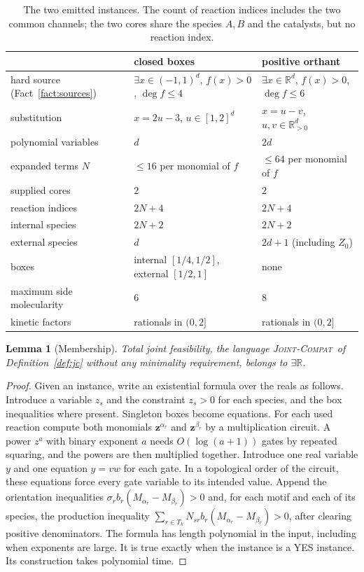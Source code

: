 \documentclass[11pt,a4paper]{article}
\theoremstyle{plain}
\newtheorem{lemma}[theorem]{Lemma}
\theoremstyle{definition}
\theoremstyle{remark}
\newcommand{\ER}{\exists\mathbb{R}}
\newcommand{\R}{\mathbb{R}}
\newcommand{\act}{\boldsymbol z}
\newcommand{\JC}{\textup{\textsc{Joint-Compat}}}
\begin{document}
\begin{table}[t]
\centering\small
\begin{tabular}{@{}lll@{}}\toprule
 & closed boxes & positive orthant\\\midrule
hard source (Fact~\ref{fact:sources}) & $\exists x\in(-1,1)^d$, $f(x)>0$, $\deg f\le4$ & $\exists x\in\R^d$, $f(x)>0$, $\deg f\le6$\\
substitution & $x=2u-3$, $u\in[1,2]^d$ & $x=u-v$, $u,v\in\R^d_{>0}$\\
polynomial variables & $d$ & $2d$\\
expanded terms $N$ & $\le16$ per monomial of $f$ & $\le64$ per monomial of $f$\\
supplied cores & $2$ & $2$\\
reaction indices & $2N+4$ & $2N+4$\\
internal species & $2N+2$ & $2N+2$\\
external species & $d$ & $2d+1$ (including $Z_0$)\\
boxes & internal $[1/4,1/2]$, external $[1/2,1]$ & none\\
maximum side molecularity & $6$ & $8$\\
kinetic factors & rationals in $(0,2]$ & rationals in $(0,2]$\\\bottomrule
\end{tabular}
\caption{The two emitted instances. The count of reaction indices includes the two common channels; the two cores share the species $A,B$ and the catalysts, but no reaction index.}
\label{tab:size}
\end{table}

\begin{lemma}[Membership]\label{lem:membership}
Total joint feasibility, the language \JC\ of Definition~\ref{def:jc} without any minimality requirement, belongs to $\ER$.
\end{lemma}

\begin{proof}
Given an instance, write an existential formula over the reals as follows. Introduce a variable $z_s$ and the constraint $z_s>0$ for each species, and the box inequalities where present. Singleton boxes become equations. For each used reaction compute both monomials $\act^{\alpha_r}$ and $\act^{\beta_r}$ by a multiplication circuit. A power $z^a$ with binary exponent $a$ needs $O(\log(a+1))$ gates by repeated squaring, and the powers are then multiplied together. Introduce one real variable $y$ and one equation $y=vw$ for each gate. In a topological order of the circuit, these equations force every gate variable to its intended value. Append the orientation inequalities $\sigma_rb_r(M_{\alpha_r}-M_{\beta_r})>0$ and, for each motif and each of its species, the production inequality $\sum_{r\in T_k}N_{sr}b_r(M_{\alpha_r}-M_{\beta_r})>0$, after clearing positive denominators. The formula has length polynomial in the input, including when exponents are large. It is true exactly when the instance is a YES instance. Its construction takes polynomial time.
\end{proof}
\end{document}
